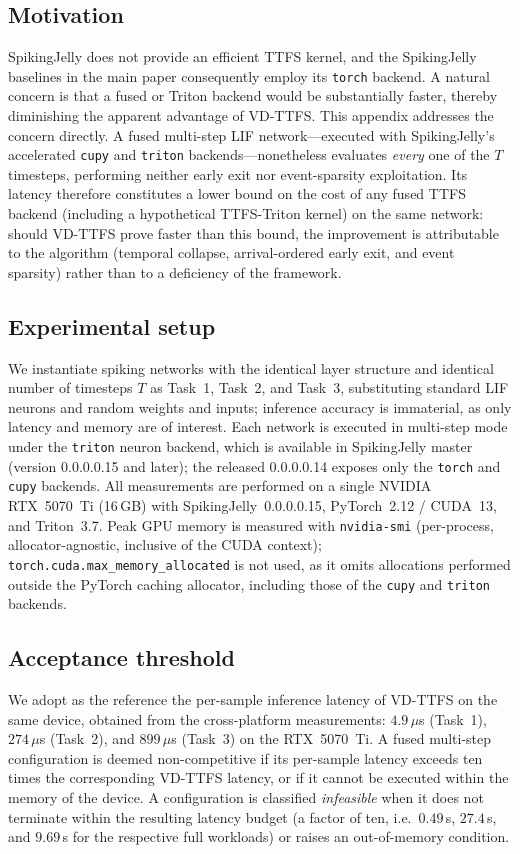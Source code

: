 \documentclass[runningheads]{llncs}
\begin{document}
\subsection{Motivation}\label{app:sjfused-purpose}
SpikingJelly does not provide an efficient TTFS kernel, and the SpikingJelly
baselines in the main paper consequently employ its \texttt{torch} backend. A
natural concern is that a fused or Triton backend would be substantially faster,
thereby diminishing the apparent advantage of VD-TTFS. This appendix addresses the
concern directly. A fused multi-step LIF network---executed with SpikingJelly's
accelerated \texttt{cupy} and \texttt{triton} backends---nonetheless evaluates
\emph{every} one of the $T$ timesteps, performing neither early exit nor
event-sparsity exploitation. Its latency therefore constitutes a lower bound on the
cost of any fused TTFS backend (including a hypothetical TTFS-Triton kernel) on the
same network: should VD-TTFS prove faster than this bound, the improvement is
attributable to the algorithm (temporal collapse, arrival-ordered early exit, and
event sparsity) rather than to a deficiency of the framework.

\subsection{Experimental setup}\label{app:sjfused-setup}
We instantiate spiking networks with the identical layer structure and identical
number of timesteps $T$ as Task~1, Task~2, and Task~3, substituting standard LIF
neurons and random weights and inputs; inference accuracy is immaterial, as only
latency and memory are of interest. Each network is executed in multi-step mode
under the \texttt{triton} neuron backend, which is available in SpikingJelly master
(version 0.0.0.0.15 and later); the released 0.0.0.0.14 exposes only the
\texttt{torch} and \texttt{cupy} backends. All measurements are performed on a
single NVIDIA RTX~5070~Ti (16\,GB) with SpikingJelly~0.0.0.0.15, PyTorch~2.12 /
CUDA~13, and Triton~3.7. Peak GPU memory is measured with \texttt{nvidia-smi}
(per-process, allocator-agnostic, inclusive of the CUDA context);
\texttt{torch.cuda.max\_memory\_allocated} is not used, as it omits allocations
performed outside the PyTorch caching allocator, including those of the
\texttt{cupy} and \texttt{triton} backends.

\subsection{Acceptance threshold}\label{app:sjfused-threshold}
We adopt as the reference the per-sample inference latency of VD-TTFS on the same
device, obtained from the cross-platform measurements: $4.9\,\mu$s (Task~1),
$274\,\mu$s (Task~2), and $899\,\mu$s (Task~3) on the RTX~5070~Ti. A fused
multi-step configuration is deemed non-competitive if its per-sample latency
exceeds ten times the corresponding VD-TTFS latency, or if it cannot be executed
within the memory of the device. A configuration is classified \emph{infeasible}
when it does not terminate within the resulting latency budget (a factor of ten,
i.e.\ $0.49$\,s, $27.4$\,s, and $9.69$\,s for the respective full workloads) or
raises an out-of-memory condition.
\end{document}
